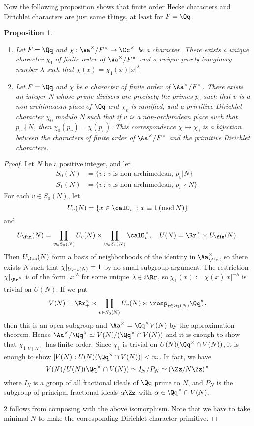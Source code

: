 \documentclass{article}
\newcommand{\Mod}[1]{\,(\mathrm{mod}\,#1)}
\newtheorem{proposition}{Proposition}[section]
\begin{document}
Now the following proposition shows that finite order Hecke characters and Dirichlet characters are just same things, at least for $F = \Qq$. 
\begin{proposition}
\label{dirad}
\begin{enumerate}
\item Let $F = \Qq$ and $\chi:\Aa^{\times}/F^{\times} \to \Cc^{\times}$ be a character. There exists a unique character $\chi_{1}$ of finite order of $\Aa^{\times}/F^{\times}$ and a unique purely imaginary number $\lambda$ such that $\chi(x) = \chi_{1}(x) |x|^{\lambda}$. 
\item Let $F = \Qq$ and $\chi$ be a character of finite order of $\Aa^{\times}/F^{\times}$. 
There exists an integer $N$ whose prime divisors are precisely the primes $p_{v}$ such that $v$ is a non-archimedean place of $\Qq$ and $\chi_{v}$ is ramified, and a primitive Dirichlet character $\chi_{0}$ modulo $N$ such that if $v$ is a non-archimdean place such that $p_{v}\nmid N$, then $\chi_{0}(p_{v}) = \chi(p_{v})$. 
This correspondence $\chi\mapsto \chi_{0}$ is a bijection between the characters of finite order of $\Aa^{\times}/F^{\times}$ and the primitive Dirichlet characters. 
\end{enumerate}
\end{proposition}
\begin{proof}
Let $N$ be a positive integer, and let 
\begin{align*}
S_{0}(N) &= \{v\,:\, v\text{ is non-archimedean},\, p_{v}|N\} \\
S_{1}(N) &= \{v\,:\, v\text{ is non-archimedean},\, p_{v}\nmid N\}.
\end{align*}
For each $v\in S_{0}(N)$, let 
$$
U_{v}(N) = \{x\in\calO_{v}\,:\, x\equiv 1\Mod{N}\}
$$
and
$$
U_{\fin}(N) = \prod_{v\in S_{0}(N)} U_{v}(N) \times \prod_{v\in S_{1}(N)} \calO_{v}^{\times}, \quad U(N) = \Rr_{+}^{\times} \times U_{\fin}(N).
$$
Then $U_{\fin}(N)$ form a basis of neighborhoods of the identity in $\Aa_{\fin}^{\times}$, so there exists $N$ such that $\chi|_{U_{\fin}(N)}=1$ by no small subgroup argument. 
The restriction $\chi|_{\Rr_{+}^{\times}}$ is of the form $|x|^{\lambda}$ for some unique $\lambda\in i\Rr$, so $\chi_{1}(x):= \chi(x)|x|^{-\lambda}$ is trivial on $U(N)$. 
If we put 
$$
V(N) = \Rr_{+}^{\times} \times \prod_{v\in S_{0}(N)} U_{v}(N) \times\resp_{v\in S_{1}(N)} \Qq_{v}^{\times},
$$
then this is an open subgroup and $\Aa^{\times} = \Qq^{\times}V(N)$ by the approximation theorem. 
Hence $\Aa^{\times}/\Qq^{\times} \simeq V(N) /(\Qq^{\times}\cap V(N))$ and it is enough to show that $\chi_{1}|_{V(N)}$ has finite order. Since $\chi_{1}$ is trivial on $U(N)(\Qq^{\times}\cap V(N))$, it is enough to show $[V(N):U(N)(\Qq^{\times} \cap V(N))] <\infty$. 
In fact, we have
$$
V(N)/U(N)(\Qq^{\times}\cap V(N)) \simeq I_{N}/P_{N} \simeq (\Zz/N\Zz)^{\times}
$$
where $I_{N}$ is a group of all fractional ideals of $\Qq$ prime to $N$, and $P_{N}$ is the subgroup of principal fractional ideals $\alpha\Zz$ with $\alpha\in \Qq^{\times} \cap V(N)$. 

2  follows from composing with the above isomorphism. Note that we have to take minimal $N$ to make the corresponding Dirichlet character primitive. 
\end{proof}
\end{document}
